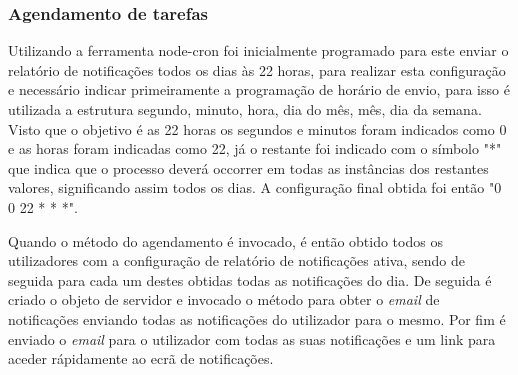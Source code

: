\subsubsection{Agendamento de tarefas}

Utilizando a ferramenta node-cron foi inicialmente programado para este enviar o relatório de notificações todos os dias às 22 horas, para realizar esta configuração e necessário indicar primeiramente a programação de horário de envio, para isso é utilizada a estrutura segundo, minuto, hora, dia do mês, mês, dia da semana. Visto que o objetivo é as 22 horas os segundos e minutos foram indicados como 0 e as horas foram indicadas como 22, já o restante foi indicado com o símbolo "*" que indica que o processo deverá occorrer em todas as instâncias dos restantes valores, significando assim todos os dias. A configuração final obtida foi então "0 0 22 * * *".

Quando o método do agendamento é invocado, é então obtido todos os utilizadores com a configuração de relatório de notificações ativa, sendo de seguida para cada um destes obtidas todas as notificações do dia. De seguida é criado o objeto de servidor e invocado o método para obter o \textit{email} de notificações enviando todas as notificações do utilizador para o mesmo. Por fim é enviado o \textit{email} para o utilizador com todas as suas notificações e um link para aceder rápidamente ao ecrã de notificações.